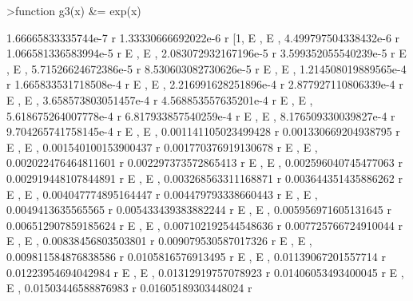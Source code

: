 \documentclass[a4paper,10pt]{article}
\begin{document}
\begin{eulernotebook}
\begin{euleroutput}
\end{euleroutput}
\begin{eulerprompt}
>function g3(x) &= exp(x)
\end{eulerprompt}
\begin{euleroutput}
  
               1.66665833335744e-7 r   1.33330666692022e-6 r
          [1, E                     , E                     , 
   4.499797504338432e-6 r   1.066581336583994e-5 r
  E                      , E                      , 
   2.083072932167196e-5 r   3.599352055540239e-5 r
  E                      , E                      , 
   5.71526624672386e-5 r   8.530603082730626e-5 r
  E                     , E                      , 
   1.214508019889565e-4 r   1.665833531718508e-4 r
  E                      , E                      , 
   2.216991628251896e-4 r   2.877927110806339e-4 r
  E                      , E                      , 
   3.658573803051457e-4 r   4.568853557635201e-4 r
  E                      , E                      , 
   5.618675264007778e-4 r   6.817933857540259e-4 r
  E                      , E                      , 
   8.176509330039827e-4 r   9.704265741758145e-4 r
  E                      , E                      , 
   0.001141105023499428 r   0.001330669204938795 r
  E                      , E                      , 
   0.001540100153900437 r   0.001770376919130678 r
  E                      , E                      , 
   0.002022476464811601 r   0.002297373572865413 r
  E                      , E                      , 
   0.002596040745477063 r   0.002919448107844891 r
  E                      , E                      , 
   0.003268563311168871 r   0.003644351435886262 r
  E                      , E                      , 
   0.004047774895164447 r   0.004479793338660443 r
  E                      , E                      , 
   0.0049413635565565 r   0.005433439383882244 r
  E                    , E                      , 
   0.005956971605131645 r   0.006512907859185624 r
  E                      , E                      , 
   0.007102192544548636 r   0.007725766724910044 r
  E                      , E                      , 
   0.00838456803503801 r   0.009079530587017326 r
  E                     , E                      , 
   0.009811584876838586 r   0.0105816576913495 r
  E                      , E                    , 
   0.01139067201557714 r   0.01223954694042984 r
  E                     , E                     , 
   0.01312919757078923 r   0.01406053493400045 r
  E                     , E                     , 
   0.01503446588876983 r   0.01605189303448024 r

\end{euleroutput}
\end{eulernotebook}
\end{document}
